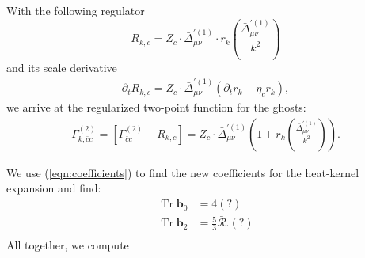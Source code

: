 With the following regulator 
\begin{equation}
	R_{k,c} = Z_c\cdot\bar{\Delta}_{\mu\nu}^{'(1)}\cdot r_k\left(\frac{\bar{\Delta}_{\mu\nu}^{'(1)}}{k^2}\right)
\end{equation}
and its scale derivative
\begin{align}
	\partial_t R_{k,c} =  Z_c\cdot\bar{\Delta}_{\mu\nu}^{'(1)}\left(\partial_tr_k - \eta_c r_k\right),
\end{align}
we arrive at the regularized two-point function for the ghosts: 
\begin{align}
	\Gamma^{(2)}_{k, \bar{c}c} = \left[\Gamma^{(2)}_{\bar{c}c}+ R_{k, c}\right]  = Z_c \cdot\bar{\Delta}_{\mu\nu}^{'(1)}\left(1 + r_k\left(\frac{\bar{\Delta}_{\mu\nu}^{'(1)}}{k^2}\right)\right).
\end{align}


We use (\ref{eqn:coefficients}) to find the new coefficients for the heat-kernel expansion and find:
\begin{equation}
\begin{aligned}
	\operatorname{Tr}\mathbf{b}_0 &= 4 (?) \\
	\operatorname{Tr}\mathbf{b}_2 &= \frac{5}{3}\bar{\mathcal{R}}. (?)\\
\end{aligned} 
\end{equation}
All together, we compute 


